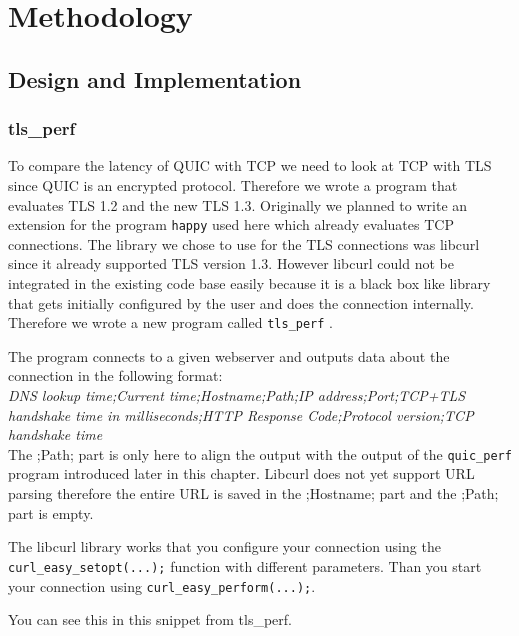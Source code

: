 \chapter{Methodology}
\label{chapter:methodology}

\section{Design and Implementation}

\subsection{tls\_perf}
\label{section:tls_perf}

To compare the latency of QUIC with TCP we need to look at TCP with TLS since QUIC is an encrypted protocol.
Therefore we wrote a program that evaluates TLS 1.2 and the new TLS 1.3.
Originally we planned to write an extension for the program  \texttt{happy} \cite{Link:happy} used here \cite{DBLP:conf/anrw/BajpaiS16} which already evaluates TCP connections.
The library we chose to use for the TLS connections was libcurl since it already supported TLS version 1.3.
However libcurl could not be integrated in the existing code base easily because it is a black box like library that gets initially configured by the user and does the connection internally.
Therefore we wrote a new program called  \texttt{tls\_perf} \cite{Link:tls_perfGithub}.

The program connects to a given webserver and outputs data about the connection in the following format:\\

\textit{DNS lookup time;Current time;Hostname;Path;IP address;Port;TCP+TLS handshake time in milliseconds;HTTP Response Code;Protocol version;TCP handshake time}\\

The ;Path; part is only here to align the output with the output of the  \texttt{quic\_perf} program introduced later in this chapter.
Libcurl does not yet support URL parsing therefore the entire URL is saved in the ;Hostname; part and the ;Path; part is empty.

The libcurl library works that you configure your connection using the\\ 
\texttt{curl\_easy\_setopt(...);} function with different parameters.
Than you start your connection using \verb|curl_easy_perform(...);|. 

You can see this in this snippet from tls\_perf.

